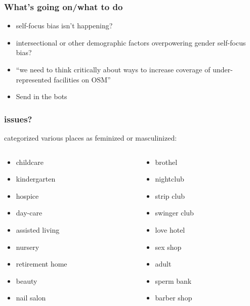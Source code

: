 \documentclass[presentation]{subfiles}
\begin{document}
\begin{frame}[t]\frametitle{What's going on/what to do}


    \alert{}
    
    \begin{itemize}
      \item self-focus bias isn't happening?
      \item intersectional or other demographic factors overpowering gender self-focus bias?
    \end{itemize}
    

    \alert{}
    \begin{itemize}
      \item ``we need to think critically about ways to increase coverage of under-represented facilities on OSM''
      \item Send in the bots
    \end{itemize}


\end{frame}


\begin{frame}[t]\frametitle{issues?}

categorized various places as \alert{feminized} or \alert{masculinized}:

\begin{columns}[T]

\begin{column}{0.48\textwidth}

\begin{itemize}
\item childcare
\item kindergarten
\item hospice
\item day-care
\item assisted living
\item nursery
\item retirement home
\item beauty
\item nail salon
\end{itemize}

\end{column}

\begin{column}{0.48\textwidth}

\begin{itemize}
\item brothel
\item nightclub
\item strip club
\item swinger club
\item love hotel
\item sex shop
\item adult
\item sperm bank
\item barber shop
\end{itemize}

\end{column}

\end{columns}
\end{frame}
\end{document}
